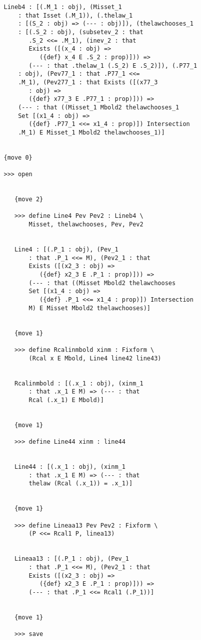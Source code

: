 \documentclass[12pt]{article}
\begin{document}
\begin{verbatim}
   Lineb4 : [(.M_1 : obj), (Misset_1 
       : that Isset (.M_1)), (.thelaw_1 
       : [(S_2 : obj) => (--- : obj)]), (thelawchooses_1 
       : [(.S_2 : obj), (subsetev_2 : that 
          .S_2 <<= .M_1), (inev_2 : that 
          Exists ([(x_4 : obj) => 
             ({def} x_4 E .S_2 : prop)])) => 
          (--- : that .thelaw_1 (.S_2) E .S_2)]), (.P77_1 
       : obj), (Pev77_1 : that .P77_1 <<= 
       .M_1), (Pev277_1 : that Exists ([(x77_3 
          : obj) => 
          ({def} x77_3 E .P77_1 : prop)])) => 
       (--- : that ((Misset_1 Mbold2 thelawchooses_1 
       Set [(x1_4 : obj) => 
          ({def} .P77_1 <<= x1_4 : prop)]) Intersection 
       .M_1) E Misset_1 Mbold2 thelawchooses_1)]


   {move 0}

   >>> open


      {move 2}

      >>> define Line4 Pev Pev2 : Lineb4 \
          Misset, thelawchooses, Pev, Pev2


      Line4 : [(.P_1 : obj), (Pev_1 
          : that .P_1 <<= M), (Pev2_1 : that 
          Exists ([(x2_3 : obj) => 
             ({def} x2_3 E .P_1 : prop)])) => 
          (--- : that ((Misset Mbold2 thelawchooses 
          Set [(x1_4 : obj) => 
             ({def} .P_1 <<= x1_4 : prop)]) Intersection 
          M) E Misset Mbold2 thelawchooses)]


      {move 1}

      >>> define Rcalinmbold xinm : Fixform \
          (Rcal x E Mbold, Line4 line42 line43)


      Rcalinmbold : [(.x_1 : obj), (xinm_1 
          : that .x_1 E M) => (--- : that 
          Rcal (.x_1) E Mbold)]


      {move 1}

      >>> define Line44 xinm : line44


      Line44 : [(.x_1 : obj), (xinm_1 
          : that .x_1 E M) => (--- : that 
          thelaw (Rcal (.x_1)) = .x_1)]


      {move 1}

      >>> define Lineaa13 Pev Pev2 : Fixform \
          (P <<= Rcal1 P, linea13)


      Lineaa13 : [(.P_1 : obj), (Pev_1 
          : that .P_1 <<= M), (Pev2_1 : that 
          Exists ([(x2_3 : obj) => 
             ({def} x2_3 E .P_1 : prop)])) => 
          (--- : that .P_1 <<= Rcal1 (.P_1))]


      {move 1}

      >>> save



\end{verbatim}
\end{document}
